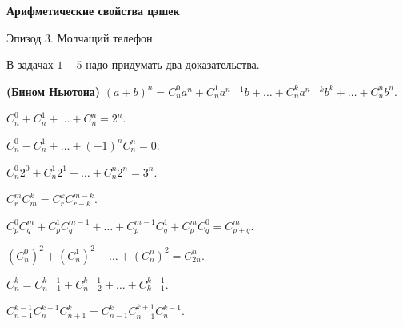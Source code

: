 \centerline{\bf \Huge Арифметические свойства цэшек}

\begin{flushright}
        \scriptsize{Эпизод 3. Молчащий телефон}
\end{flushright}

В задачах $1-5$ надо придумать два доказательства.

\textbf{(Бином Ньютона)} $(a+b)^n=C_n^0 a^n+C_n^1 a^{n-1} b+\ldots+C_n^k a^{n-k} b^k+\ldots+C_n^n b^n$.

$C_n^0+C_n^1+\ldots+C_n^n=2^n$.

$C_n^0-C_n^1+\ldots+(-1)^n C_n^n=0$.

$C_n^0 2^0+C_n^1 2^1+\ldots+C_n^n 2^n=3^n$.

$C_r^m C_m^k=C_r^k C_{r-k}^{m-k}$.

$C_p^0 C_q^m+C_p^1 C_q^{m-1}+\ldots+C_p^{m-1} C_q^1+C_p^m C_q^0=C_{p+q}^m$.

$\left(C_n^0\right)^2+\left(C_n^1\right)^2+\ldots+\left(C_n^n\right)^2=C_{2 n}^n$.

$C_n^k=C_{n-1}^{k-1}+C_{n-2}^{k-1}+\ldots+C_{k-1}^{k-1}$.

$C_{n-1}^{k-1} C_n^{k+1} C_{n+1}^k=C_{n-1}^k C_{n+1}^{k+1} C_n^{k-1}$.